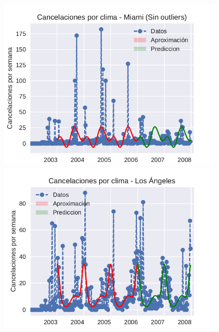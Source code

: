 \begin{figure}[H]
\centering
\begin{minipage}{.5\textwidth}
  \centering
  \includegraphics[width=1.1\linewidth]{informe/imagenes/cancelacionesClimaMiamiPrediccionV1.pdf}
\end{minipage}%
\begin{minipage}{.5\textwidth}
  \centering
    \includegraphics[width=1.1\linewidth]{informe/imagenes/cancelacionesClimaLosAngelesPrediccionV1.pdf}
\end{minipage}
\end{figure}

